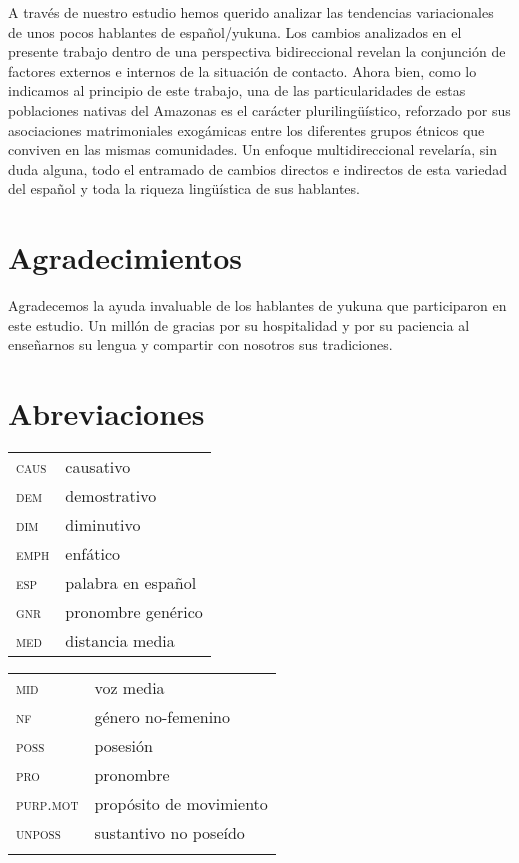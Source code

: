 \documentclass[output=paper]{langscibook}
\begin{document}
A través de nuestro estudio hemos querido analizar las tendencias variacionales de unos pocos hablantes de español/yukuna. Los cambios analizados en el presente trabajo dentro de una perspectiva bidireccional revelan la conjunción de factores externos e internos de la situación de contacto. Ahora bien, como lo indicamos al principio de este trabajo, una de las particularidades de estas poblaciones nativas del Amazonas es el carácter plurilingüístico, reforzado por sus asociaciones matrimoniales exogámicas entre los diferentes grupos étnicos que conviven en las mismas comunidades. Un enfoque multidireccional revelaría, sin duda alguna, todo el entramado de cambios directos e indirectos de esta variedad del español y toda la riqueza lingüística de sus hablantes.  

\section*{Agradecimientos}
Agradecemos la ayuda invaluable de los hablantes de yukuna que participaron en este estudio. Un millón de gracias por su hospitalidad y por su paciencia al enseñarnos su lengua y compartir con nosotros sus tradiciones.

\section*{Abreviaciones}

\begin{tabular}{ll}
\textsc{caus} & causativo\\
\textsc{dem} & demostrativo\\
\textsc{dim} & diminutivo\\
\textsc{emph} & enfático\\
\textsc{esp} & palabra en español\\
\textsc{gnr} & pronombre genérico\\
\textsc{med}&  distancia media\\
\end{tabular}
\begin{tabular}{ll}
\textsc{mid} & voz media\\
\textsc{nf} & género no-femenino\\
\textsc{poss} &  posesión\\
\textsc{pro} & pronombre\\
\textsc{purp.mot} & propósito de movimiento\\
\textsc{unposs} & sustantivo  no poseído\\
\\
\end{tabular}



\sloppy\printbibliography[heading=subbibliography,notkeyword=this]
\end{document}
